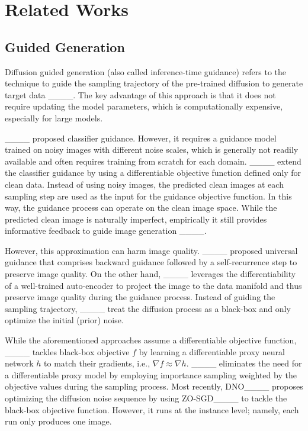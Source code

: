 \section{Related Works}
\subsection{Guided Generation}
Diffusion guided generation (also called inference-time guidance) refers to the technique to guide the sampling trajectory of the pre-trained diffusion to generate target data ____. The key advantage of this approach is that it does not require updating the model parameters, which is computationally expensive, especially for large models.

____ proposed classifier guidance. However, it requires a guidance model trained on noisy images with different noise scales, which is generally not readily available and often requires training from scratch for each domain. ____ extend the classifier guidance by using a differentiable objective function defined only for clean data. Instead of using noisy images, the predicted clean images at each sampling step are used as the input for the guidance objective function. In this way, the guidance process can operate on the clean image space. While the predicted clean image is naturally imperfect, empirically it still provides informative feedback to guide image generation ____.

However, this approximation can harm image quality. ____ proposed universal guidance that comprises backward guidance followed by a self-recurrence step to preserve image quality. On the other hand, ____ leverages the differentiability of a well-trained auto-encoder to project the image to the data manifold and thus preserve image quality during the guidance process. Instead of guiding the sampling trajectory, ____ treat the diffusion process as a black-box and only optimize the initial (prior) noise.

While the aforementioned approaches assume a differentiable objective function, ____ tackles black-box objective $f$ by learning a differentiable proxy neural network $h$ to match their gradients, i.e., $\nabla f \approx \nabla h$. ____ eliminates the need for a differentiable proxy model by employing importance sampling weighted by the objective values during the sampling process. Most recently, DNO____ proposes optimizing the diffusion noise sequence by using ZO-SGD____ to tackle the black-box objective function. However, it runs at the instance level; namely, each run only produces one image.

